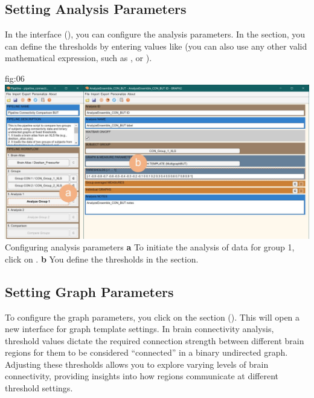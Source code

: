\documentclass[justified]{tufte-handout}
\begin{document}
\subsection{Setting Analysis Parameters}

In the  interface (), you can configure the analysis parameters.
In the  section, you can define the thresholds by entering values like  (you can also use any other valid mathematical expression, such as , or ).

{fig:06}
{
	\includegraphics{fig06.jpg}
}
{Configuring analysis parameters}
{
	{\bf a} To initiate the analysis of data for group 1, click on .
	{\bf b} You define the thresholds in the  section.
}

\subsection{Setting Graph Parameters}

To configure the graph parameters, you click on the section  (). This will open a new interface for graph template settings. 
In brain connectivity analysis, threshold values dictate the required connection strength between different brain regions for them to be considered “connected” in a binary undirected graph. 
Adjusting these thresholds allows you to explore varying levels of brain connectivity, providing insights into how regions communicate at different threshold settings.
\end{document}
